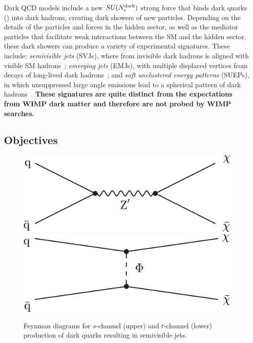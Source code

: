 Dark QCD models include a new $SU(N_{c}^{\text{dark}})$ strong force that binds dark quarks (\Pqdark) into dark hadrons, creating dark showers of new particles.
Depending on the details of the particles and forces in the hidden sector,
as well as the mediator particles that facilitate weak interactions between the SM and the hidden sector,
these dark showers can produce a variety of experimental signatures.
These include: \emph{semivisible jets} (SVJs), where \met from invisible dark hadrons is aligned with visible SM hadrons~\cite{Cohen:2015toa};
\emph{emerging jets} (EMJs), with multiple displaced vertices from decays of long-lived dark hadrons~\cite{Schwaller:2015gea};
and \emph{soft unclustered energy patterns} (SUEPs), in which unsuppressed large angle emissions lead to a spherical pattern of dark hadrons~\cite{Knapen:2016hky}.
\textbf{These signatures are quite distinct from the expectations from WIMP dark matter and therefore are not probed by WIMP searches.}

\subsection{Objectives}\label{subsec:dmobj}

\begin{figure}
\centering
\includegraphics[width=0.47\myfigurewidth]{figures/zPrime_feyn.pdf}\\
\includegraphics[width=0.47\myfigurewidth]{figures/tChan_feyn.pdf}
\caption{Feynman diagrams for $s$-channel (upper) and $t$-channel (lower) production of dark quarks \Pqdark resulting in semivisible jets.}
\label{fig:diagrams}
\end{figure}

